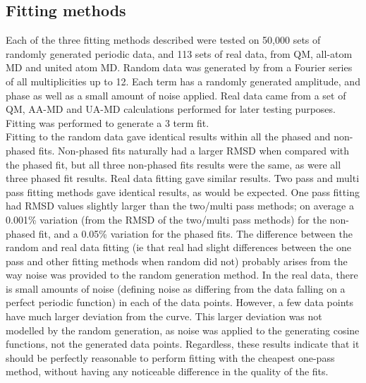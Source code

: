 \documentclass[11pt, oneside, draft]{article}   	%
\begin{document}
\subsection{Fitting methods}
Each of the three fitting methods described were tested on 50,000 sets of randomly generated periodic data, and 113 sets of real data, from QM, all-atom MD and united atom MD. Random data was generated by from a Fourier series of all multiplicities up to 12. Each term has a randomly generated amplitude, and phase as well as a small amount of noise applied. Real data came from a set of QM, AA-MD and UA-MD calculations performed for later testing purposes. Fitting was performed to generate a 3 term fit.\\
Fitting to the random data gave identical results within all the phased and non-phased fits. Non-phased fits naturally had a larger RMSD when compared with the phased fit, but all three non-phased fits results were the same, as were all three phased fit results. Real data fitting gave similar results. Two pass and multi pass fitting methods gave identical results, as would be expected. One pass fitting had RMSD values slightly larger than the two/multi pass methods; on average a 0.001\% variation (from the RMSD of the two/multi pass methods) for the non-phased fit, and a 0.05\% variation for the phased fits. The difference between the random and real data fitting (ie that real had slight differences between the one pass and other fitting methods when random did not) probably arises from the way noise was provided to the random generation method. In the real data, there is small amounts of noise (defining noise as differing from the data falling on a perfect periodic function) in each of the data points. However, a few data points have much larger deviation from the curve. This larger deviation was not modelled by the random generation, as noise was applied to the generating cosine functions, not the generated data points. Regardless, these results indicate that it should be perfectly reasonable to perform fitting with the cheapest one-pass method, without having any noticeable difference in the quality of the fits.
\end{document}
